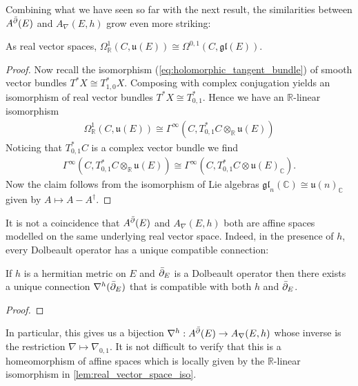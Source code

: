 \documentclass[12pt]{ociamthesis}  %
\begin{document}
Combining what we have seen so far with the next result, the
similarities between $A^{\bar{\partial}} (E)$ and $A_\nabla(E,h)$ grow even more
striking:

\begin{lemma}\label{lem:real_vector_space_iso}
  As real vector spaces,
  $\Omega^1_{\mathbb{R}}(C,\mathfrak u(E))\cong\Omega^{0,1}(C,\mathfrak{gl}(E))$.
  \begin{proof}
    Now recall the isomorphism (\ref{eq:holomorphic_tangent_bundle}) of
    smooth vector bundles $T^* X \cong T^*_{1,0} X$. Composing with
    complex conjugation yields an isomorphism of real vector bundles
    $T^*X \cong T^*_{0,1}$. Hence we have an $\mathbb{R}$-linear
    isomorphism
    \begin{align*}
      \Omega^1_{\mathbb{R}}(C,\mathfrak u(E))
      \cong \Gamma^\infty(C,T^*_{0,1}C \otimes_{\mathbb{R}}\mathfrak u(E))
    \end{align*}
    Noticing that $T_{0,1}^* C$ is a complex vector bundle
    we find
    \begin{align*}
      \Gamma^\infty(C,T^*_{0,1}C \otimes_{\mathbb{R}}\mathfrak u(E))
      \cong\Gamma^\infty(C,T^*_{0,1}C \otimes\mathfrak u(E)_{\mathbb{C}}).
    \end{align*}
    Now the claim follows from the isomorphism of Lie algebras
    $\mathfrak{gl}_n(\mathbb{C})\cong\mathfrak u(n)_{\mathbb{C}}$
    given by $A \mapsto A-A^\dagger$.
  \end{proof}
\end{lemma}

It is not a coincidence that $A^{\bar{\partial}} (E)$ and $A_\nabla(E,h)$ both are
affine spaces modelled on the same underlying real vector space.
Indeed, in the presence of $h$, every Dolbeault operator has a unique
compatible connection:

\begin{theorem}\label{thm:chern_connection}
  If $h$ is a hermitian metric on $E$ and $\bar{\partial}_E$ is a Dolbeault
  operator then there exists a unique connection $\nabla^h(\bar{\partial}_E)$
  that is compatible with both $h$ and $\bar{\partial}_E$.
  \begin{proof}
    \missingproof
  \end{proof}
\end{theorem}

In particular, this gives us a bijection
$\nabla^h : A^{\bar{\partial}} (E) \to A_\nabla(E,h)$ whose inverse is the restriction
$\nabla \mapsto \nabla_{0,1}$. It is not difficult to verify that this
is a homeomorphism of affine spaces which is locally given by
the $\mathbb{R}$-linear isomorphism in \ref{lem:real_vector_space_iso}.
\end{document}
